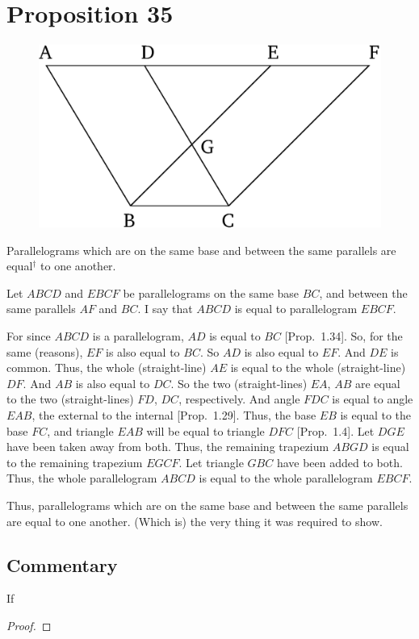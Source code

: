 \chapter*{Proposition 35}



\begin{figure}[ht]
    \begin{center}
    \includegraphics[width=0.5\linewidth]{figures/fig35e.eps}
    \label{fig:prop_35}
    \end{center}
\end{figure}

Parallelograms which are on the same base and between the same
parallels are equal$^\dag$ to one another.

Let $ABCD$ and $EBCF$ be parallelograms on the same base $BC$, and
between the same parallels $AF$ and $BC$. I say that $ABCD$ is equal to
parallelogram $EBCF$.

For since $ABCD$ is a parallelogram, $AD$ is equal to $BC$ [Prop.~1.34].
So, for the same (reasons), $EF$ is also equal to $BC$. So $AD$ is also equal to
$EF$. And $DE$ is common. Thus, the whole (straight-line) $AE$ is equal
to the whole (straight-line) $DF$.  And $AB$ is also equal to $DC$.
So the two (straight-lines) $EA$, $AB$
are equal to the two (straight-lines) $FD$, $DC$, respectively. And angle $FDC$ is
equal to angle $EAB$, the external to the internal [Prop.~1.29]. Thus, the
base $EB$ is equal to the base $FC$, and triangle $EAB$ will be equal to triangle
$DFC$ [Prop.~1.4]. Let $DGE$ have been taken away from both. 
Thus, the remaining trapezium $ABGD$ is equal to the remaining trapezium
$EGCF$. Let triangle $GBC$ have been added to both. Thus, the whole
parallelogram $ABCD$ is equal to the whole parallelogram $EBCF$.

Thus, parallelograms which are on the same base and between the same
parallels are equal to one another. (Which is) the very thing it was required to
show.



\section*{Commentary}

\begin{proposition}\label{proposition_35}\leanok
    If
\end{proposition}
\begin{proof}
    \leanok
\end{proof}
